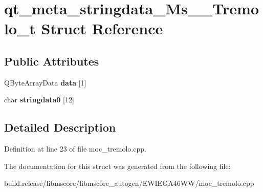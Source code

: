 \hypertarget{structqt__meta__stringdata___ms_____tremolo__t}{}\section{qt\+\_\+meta\+\_\+stringdata\+\_\+\+Ms\+\_\+\+\_\+\+Tremolo\+\_\+t Struct Reference}
\label{structqt__meta__stringdata___ms_____tremolo__t}
\subsection*{Public Attributes}
\begin{DoxyCompactItemize}
\item 
\mbox{\label{structqt__meta__stringdata___ms_____tremolo__t_a162e805dab5d819142a3b0e7483ab291}} 
Q\+Byte\+Array\+Data {\bfseries data} \mbox{[}1\mbox{]}
\item 
\mbox{\label{structqt__meta__stringdata___ms_____tremolo__t_ae70b7452272df0e329a4be3a6529685d}} 
char {\bfseries stringdata0} \mbox{[}12\mbox{]}
\end{DoxyCompactItemize}


\subsection{Detailed Description}


Definition at line 23 of file moc\+\_\+tremolo.\+cpp.



The documentation for this struct was generated from the following file\+:\begin{DoxyCompactItemize}
\item 
build.\+release/libmscore/libmscore\+\_\+autogen/\+E\+W\+I\+E\+G\+A46\+W\+W/moc\+\_\+tremolo.\+cpp\end{DoxyCompactItemize}
